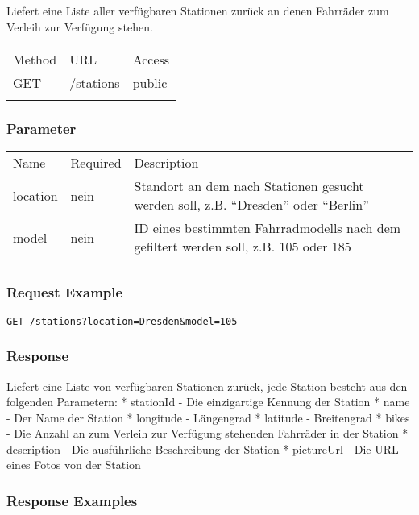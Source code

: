 Liefert eine Liste aller verfügbaren Stationen zurück an denen Fahrräder
zum Verleih zur Verfügung stehen.

\begin{longtable}[c]{@{}lll@{}}
\toprule\addlinespace
Method & URL & Access
\\\addlinespace
\midrule\endhead
GET & /stations & public
\\\addlinespace
\bottomrule
\end{longtable}

\subsubsection{Parameter}\label{parameter}

\begin{longtable}[c]{@{}lll@{}}
\toprule\addlinespace
Name & Required & Description
\\\addlinespace
\midrule\endhead
location & nein & Standort an dem nach Stationen gesucht werden soll,
z.B. ``Dresden'' oder ``Berlin''
\\\addlinespace
model & nein & ID eines bestimmten Fahrradmodells nach dem gefiltert
werden soll, z.B. 105 oder 185
\\\addlinespace
\bottomrule
\end{longtable}

\subsubsection{Request Example}\label{request-example}

\begin{verbatim}
GET /stations?location=Dresden&model=105
\end{verbatim}

\subsubsection{Response}\label{response}

Liefert eine Liste von verfügbaren Stationen zurück, jede Station
besteht aus den folgenden Parametern: * stationId - Die einzigartige
Kennung der Station * name - Der Name der Station * longitude -
Längengrad * latitude - Breitengrad * bikes - Die Anzahl an zum Verleih
zur Verfügung stehenden Fahrräder in der Station * description - Die
ausführliche Beschreibung der Station * pictureUrl - Die URL eines Fotos
von der Station

\subsubsection{Response Examples}\label{response-examples}

